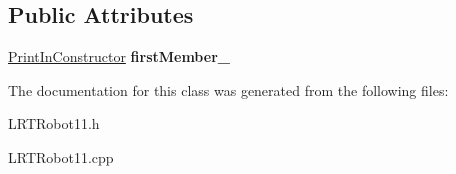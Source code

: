 \subsection*{\-Public \-Attributes}
\begin{DoxyCompactItemize}
\item 
\hypertarget{class_l_r_t_robot11_a8efbe77b67f050ffc5d43363dba7065d}{
\hyperlink{class_print_in_constructor}{\-Print\-In\-Constructor} {\bfseries first\-Member\-\_\-}}
\label{class_l_r_t_robot11_a8efbe77b67f050ffc5d43363dba7065d}

\end{DoxyCompactItemize}


\-The documentation for this class was generated from the following files\-:\begin{DoxyCompactItemize}
\item 
\-L\-R\-T\-Robot11.\-h\item 
\-L\-R\-T\-Robot11.\-cpp\end{DoxyCompactItemize}
